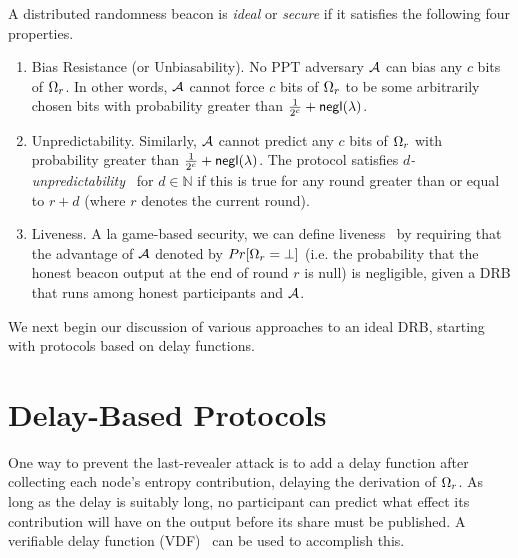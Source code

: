 \begin{definition}
A distributed randomness beacon is \textit{ideal} or \textit{secure} if it satisfies the following four properties.
\begin{enumerate}
\item Bias Resistance (or Unbiasability). No PPT adversary $\mathcal{A}$ can bias any $c$ bits of $\Omega_r$. In other words, $\mathcal{A}$ cannot force $c$ bits of $\Omega_r$ to be some arbitrarily chosen bits with probability greater than $\frac{1}{2^c} + \mathsf{negl}(\lambda)$.
\item Unpredictability. Similarly, $\mathcal{A}$ cannot predict any $c$ bits of $\Omega_r$ with probability greater than $\frac{1}{2^c} + \mathsf{negl}(\lambda)$. The protocol satisfies \textit{$d$-unpredictability}~\cite{bhat2020randpiper} for $d \in \mathbb{N}$ if this is true for any round greater than or equal to $r + d$ (where $r$ denotes the current round).
\item Liveness. A la game-based security, we can define liveness~\cite{guo2020secRand} by requiring that the advantage of $\mathcal{A}$ denoted by $Pr[\Omega_r = \text{$\perp$}]$ (i.e. the probability that the honest beacon output at the end of round $r$ is null) is negligible, given a DRB that runs among honest participants and $\mathcal{A}$.
\end{enumerate}
\end{definition}

We next begin our discussion of various approaches to an ideal DRB, starting with protocols based on delay functions.

\section{Delay-Based Protocols}
\label{section:delay}
One way to prevent the last-revealer attack is to add a delay function after collecting each node's entropy contribution, delaying the derivation of $\Omega_r$. As long as the delay is suitably long, no participant can predict what effect its contribution will have on the output before its share must be published. A verifiable delay function (VDF)~\cite{boneh2018verifiable,boneh2018survey} can be used to accomplish this.

